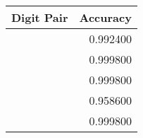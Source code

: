 \begin{tabular}{lr}
\toprule
Digit Pair & Accuracy \\
\midrule
[5, 2] & 0.992400 \\
[1, 9] & 0.999800 \\
[4, 0] & 0.999800 \\
[9, 7] & 0.958600 \\
[1, 9] & 0.999800 \\
\bottomrule
\end{tabular}
